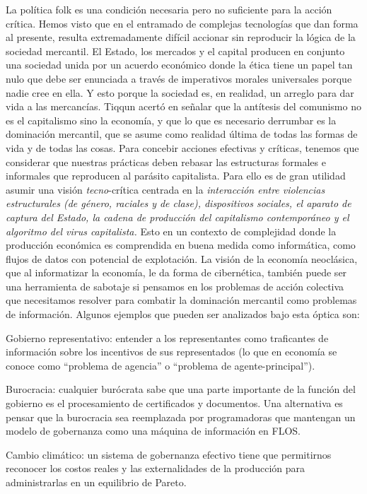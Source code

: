 La política folk es una condición necesaria pero no suficiente para la acción crítica. Hemos visto que en el entramado de complejas tecnologías que dan forma al presente, resulta extremadamente difícil accionar sin reproducir la lógica de la sociedad mercantil. El Estado, los mercados y el capital producen en conjunto una sociedad unida por un acuerdo económico donde la ética tiene un papel tan nulo que debe ser enunciada a través de imperativos morales universales porque nadie cree en ella. Y esto porque la sociedad es, en realidad, un arreglo para dar vida a las mercancías. Tiqqun acertó en señalar que la antítesis del comunismo no es el capitalismo sino la economía, y que lo que es necesario derrumbar es la dominación mercantil, que se asume como realidad última de todas las formas de vida y de todas las cosas. Para concebir acciones efectivas y críticas, tenemos que considerar que nuestras prácticas deben rebasar las estructuras formales e informales que reproducen al parásito capitalista. Para ello es de gran utilidad asumir una visión \emph{tecno}-crítica centrada en la \emph{interacción entre violencias estructurales (de género, raciales y de clase), dispositivos sociales, el aparato de captura del Estado, la cadena de producción del capitalismo contemporáneo y el algoritmo del virus capitalista.} Esto en un contexto de complejidad donde la producción económica es comprendida en buena medida como informática, como flujos de datos con potencial de explotación. La visión de la economía neoclásica, que al informatizar la economía, le da forma de cibernética, también puede ser una herramienta de sabotaje si pensamos en los problemas de acción colectiva que necesitamos resolver para combatir la dominación mercantil como problemas de información. Algunos ejemplos que pueden ser analizados bajo esta óptica son:

\begin{description}
  \item Gobierno representativo: entender a los representantes como traficantes de información sobre los incentivos de sus representados (lo que en economía se conoce como \enquote{problema de agencia} o \enquote{problema de agente-principal}).
  \item Burocracia: cualquier burócrata sabe que una parte importante de la función del gobierno es el procesamiento de certificados y documentos. Una alternativa es pensar que la burocracia sea reemplazada por programadoras que mantengan un modelo de gobernanza como una máquina de información en FLOS.
  \item Cambio climático: un sistema de gobernanza efectivo tiene que permitirnos reconocer los costos reales y las externalidades de la producción para administrarlas en un equilibrio de Pareto.
\end{description}

